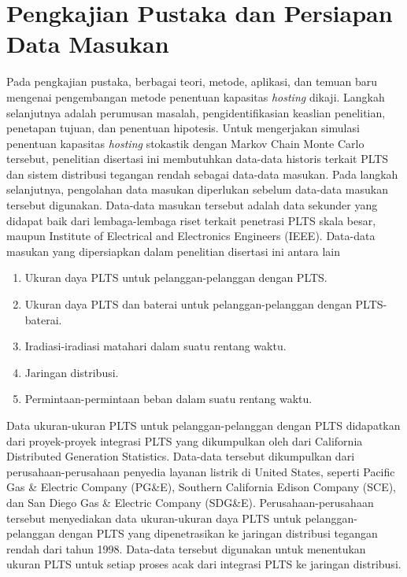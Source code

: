 \section{Pengkajian Pustaka dan Persiapan Data Masukan}
Pada pengkajian pustaka, berbagai teori, metode, aplikasi, dan temuan baru mengenai pengembangan metode penentuan kapasitas \textit{\textit{hosting}} dikaji. Langkah selanjutnya adalah perumusan masalah, pengidentifikasian keaslian penelitian, penetapan tujuan, dan penentuan hipotesis. Untuk mengerjakan simulasi penentuan kapasitas \textit{\textit{hosting}} stokastik dengan Markov Chain Monte Carlo tersebut, penelitian disertasi ini membutuhkan data-data historis terkait PLTS dan sistem distribusi tegangan rendah sebagai data-data masukan. Pada langkah selanjutnya, pengolahan data masukan diperlukan sebelum data-data masukan tersebut digunakan. Data-data masukan tersebut adalah data sekunder yang didapat baik dari lembaga-lembaga riset terkait penetrasi PLTS skala besar, maupun Institute of Electrical and Electronics Engineers (IEEE). Data-data masukan yang dipersiapkan dalam penelitian disertasi ini antara lain
\begin{enumerate}
	\item Ukuran daya PLTS untuk pelanggan-pelanggan dengan PLTS.
	\item Ukuran daya PLTS dan baterai untuk pelanggan-pelanggan dengan PLTS-baterai.
	\item Iradiasi-iradiasi matahari dalam suatu rentang waktu.
	\item Jaringan distribusi.
	\item Permintaan-permintaan beban dalam suatu rentang waktu.
\end{enumerate}

Data ukuran-ukuran PLTS untuk pelanggan-pelanggan dengan PLTS didapatkan dari proyek-proyek integrasi PLTS yang dikumpulkan oleh dari California Distributed Generation Statistics. Data-data tersebut dikumpulkan dari perusahaan-perusahaan penyedia layanan listrik di United States, seperti Pacific Gas \& Electric Company (PG\&E), Southern California Edison Company (SCE), dan San Diego Gas \& Electric Company (SDG\&E). Perusahaan-perusahaan tersebut menyediakan data ukuran-ukuran daya PLTS untuk pelanggan-pelanggan dengan PLTS yang dipenetrasikan ke jaringan distribusi tegangan rendah dari tahun 1998. Data-data tersebut digunakan untuk menentukan ukuran PLTS untuk setiap proses acak dari integrasi PLTS ke jaringan distribusi.

